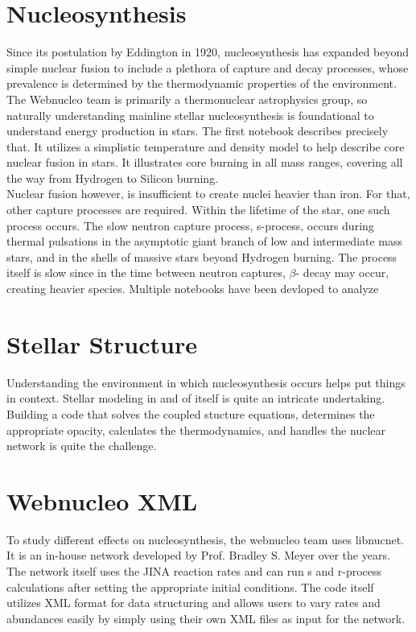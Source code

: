 \documentclass{article}
\begin{document}
\section*{Nucleosynthesis}

Since its postulation by Eddington in 1920, nucleosynthesis has expanded beyond simple nuclear fusion to include a plethora of 
capture and decay processes, whose prevalence is determined by the thermodynamic properties of the environment. The Webnucleo team 
is primarily a thermonuclear astrophysics group, so naturally understanding mainline stellar nucleosynthesis is foundational to 
understand energy production in stars. The first notebook describes precisely that. It utilizes a simplistic temperature and density 
model to help describe core nuclear fusion in stars. It illustrates core burning in all mass ranges, covering all the way from 
Hydrogen to Silicon burning.\\

Nuclear fusion however, is insufficient to create nuclei heavier than iron. For that, other capture processes are required. Within 
the lifetime of the star, one such process occurs. The slow neutron capture process, s-process, occurs during thermal pulsations in 
the asymptotic giant branch of low and intermediate mass stars, and in the shells of massive stars beyond Hydrogen burning. 
The process itself is slow since in the time between neutron captures, $\beta$- decay may occur, creating heavier species. Multiple 
notebooks have been devloped to analyze 


\section*{Stellar Structure}

Understanding the environment in which nucleosynthesis occurs helps put things in context. Stellar modeling in and of itself is quite 
an intricate undertaking. Building a code that solves the coupled stucture equations, determines the appropriate opacity, calculates the thermodynamics, 
and handles the nuclear network is quite the challenge. 

\section*{Webnucleo XML}

To study different effects on nucleosynthesis, the webnucleo team uses libnucnet. It is an in-house network developed by Prof. Bradley 
S. Meyer over the years. The network itself uses the JINA reaction rates and can run s and r-process calculations after setting the 
appropriate initial conditions. The code itself utilizes XML format for data structuring and allows users to vary rates and abundances 
easily by simply using their own XML files as input for the network.\\
\end{document}
